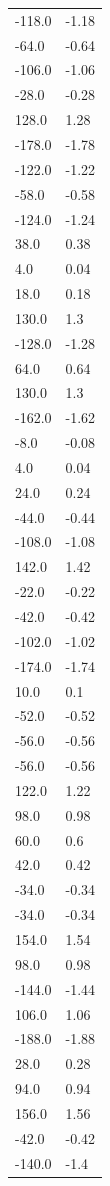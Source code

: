\begin{longtable}{ll}
-118.0 & -1.18 \\
-64.0 & -0.64 \\
-106.0 & -1.06 \\
-28.0 & -0.28 \\
128.0 & 1.28 \\
-178.0 & -1.78 \\
-122.0 & -1.22 \\
-58.0 & -0.58 \\
-124.0 & -1.24 \\
38.0 & 0.38 \\
4.0 & 0.04 \\
18.0 & 0.18 \\
130.0 & 1.3 \\
-128.0 & -1.28 \\
64.0 & 0.64 \\
130.0 & 1.3 \\
-162.0 & -1.62 \\
-8.0 & -0.08 \\
4.0 & 0.04 \\
24.0 & 0.24 \\
-44.0 & -0.44 \\
-108.0 & -1.08 \\
142.0 & 1.42 \\
-22.0 & -0.22 \\
-42.0 & -0.42 \\
-102.0 & -1.02 \\
-174.0 & -1.74 \\
10.0 & 0.1 \\
-52.0 & -0.52 \\
-56.0 & -0.56 \\
-56.0 & -0.56 \\
122.0 & 1.22 \\
98.0 & 0.98 \\
60.0 & 0.6 \\
42.0 & 0.42 \\
-34.0 & -0.34 \\
-34.0 & -0.34 \\
154.0 & 1.54 \\
98.0 & 0.98 \\
-144.0 & -1.44 \\
106.0 & 1.06 \\
-188.0 & -1.88 \\
28.0 & 0.28 \\
94.0 & 0.94 \\
156.0 & 1.56 \\
-42.0 & -0.42 \\
-140.0 & -1.4 \\

\end{longtable}
